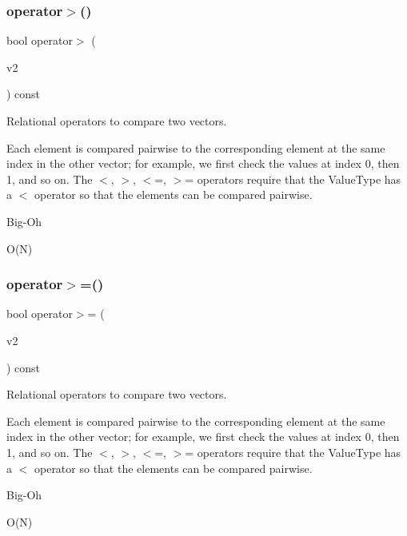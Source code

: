 \subsubsection{\texorpdfstring{operator$>$()}{operator>()}}
{\footnotesize\ttfamily bool operator$>$ (\begin{DoxyParamCaption}\item[{const \mbox{\hyperlink{classVector}{Vector}}$<$ Value\+Type $>$ \&}]{v2 }\end{DoxyParamCaption}) const}



Relational operators to compare two vectors. 

Each element is compared pairwise to the corresponding element at the same index in the other vector; for example, we first check the values at index 0, then 1, and so on. The $<$, $>$, $<$=, $>$= operators require that the Value\+Type has a $<$ operator so that the elements can be compared pairwise. \begin{DoxyRefDesc}{Big-\/\+Oh}
\item[\mbox{\hyperlink{BigOh__BigOh000148}{Big-\/\+Oh}}]O(\+N) \end{DoxyRefDesc}
\mbox{\label{classVector_adaa095641c5fc43f90754d7694784006}} 
\subsubsection{\texorpdfstring{operator$>$=()}{operator>=()}}
{\footnotesize\ttfamily bool operator$>$= (\begin{DoxyParamCaption}\item[{const \mbox{\hyperlink{classVector}{Vector}}$<$ Value\+Type $>$ \&}]{v2 }\end{DoxyParamCaption}) const}



Relational operators to compare two vectors. 

Each element is compared pairwise to the corresponding element at the same index in the other vector; for example, we first check the values at index 0, then 1, and so on. The $<$, $>$, $<$=, $>$= operators require that the Value\+Type has a $<$ operator so that the elements can be compared pairwise. \begin{DoxyRefDesc}{Big-\/\+Oh}
\item[\mbox{\hyperlink{BigOh__BigOh000149}{Big-\/\+Oh}}]O(\+N) \end{DoxyRefDesc}
\mbox{\label{classVector_a7dbb3a92c8b6a08a04b564aed136b870}} 
